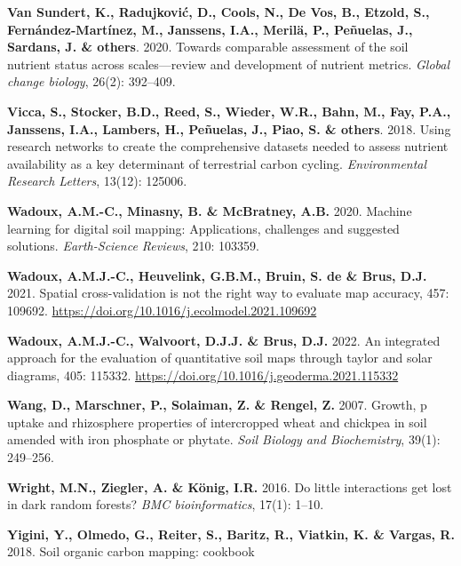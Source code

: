 \documentclass[
  10pt,
  b5paper,
  oneside]{book}
\newlength{\cslhangindent}
\newlength{\cslentryspacingunit} %
\newenvironment{CSLReferences}[2] %
 {%
  \setlength{\parindent}{0pt}
  \ifodd #1
  \let\oldpar\par
  \def\par{\hangindent=\cslhangindent\oldpar}
  \fi
  \setlength{\parskip}{#2\cslentryspacingunit}
 }%
 {}
\begin{document}
\begin{CSLReferences}{0}{0}
\leavevmode{}%
\textbf{Van Sundert, K., Radujković, D., Cools, N., De Vos, B., Etzold, S., Fernández-Martínez, M., Janssens, I.A., Merilä, P., Peñuelas, J., Sardans, J. \& others}. 2020. Towards comparable assessment of the soil nutrient status across scales---review and development of nutrient metrics. \emph{Global change biology}, 26(2): 392--409.

\leavevmode{}%
\textbf{Vicca, S., Stocker, B.D., Reed, S., Wieder, W.R., Bahn, M., Fay, P.A., Janssens, I.A., Lambers, H., Peñuelas, J., Piao, S. \& others}. 2018. Using research networks to create the comprehensive datasets needed to assess nutrient availability as a key determinant of terrestrial carbon cycling. \emph{Environmental Research Letters}, 13(12): 125006.

\leavevmode{}%
\textbf{Wadoux, A.M.-C., Minasny, B. \& McBratney, A.B.} 2020. Machine learning for digital soil mapping: Applications, challenges and suggested solutions. \emph{Earth-Science Reviews}, 210: 103359.

\leavevmode{}%
\textbf{Wadoux, A.M.J.-C., Heuvelink, G.B.M., Bruin, S. de \& Brus, D.J.} 2021. Spatial cross-validation is not the right way to evaluate map accuracy, 457: 109692. \url{https://doi.org/10.1016/j.ecolmodel.2021.109692}

\leavevmode{}%
\textbf{Wadoux, A.M.J.-C., Walvoort, D.J.J. \& Brus, D.J.} 2022. An integrated approach for the evaluation of quantitative soil maps through taylor and solar diagrams, 405: 115332. \url{https://doi.org/10.1016/j.geoderma.2021.115332}

\leavevmode{}%
\textbf{Wang, D., Marschner, P., Solaiman, Z. \& Rengel, Z.} 2007. Growth, p uptake and rhizosphere properties of intercropped wheat and chickpea in soil amended with iron phosphate or phytate. \emph{Soil Biology and Biochemistry}, 39(1): 249--256.

\leavevmode{}%
\textbf{Wright, M.N., Ziegler, A. \& König, I.R.} 2016. Do little interactions get lost in dark random forests? \emph{BMC bioinformatics}, 17(1): 1--10.

\leavevmode{}%
\textbf{Yigini, Y., Olmedo, G., Reiter, S., Baritz, R., Viatkin, K. \& Vargas, R.} 2018. Soil organic carbon mapping: cookbook

\end{CSLReferences}


\end{document}
